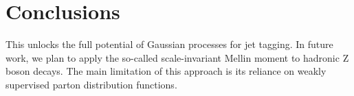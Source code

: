 \section{Conclusions}\label{sec:conclusions}

This unlocks the full potential of Gaussian processes for jet tagging.
In future work, we plan to apply the so-called scale-invariant Mellin
moment to hadronic Z boson decays. The main limitation of this approach
is its reliance on weakly supervised parton distribution functions.

